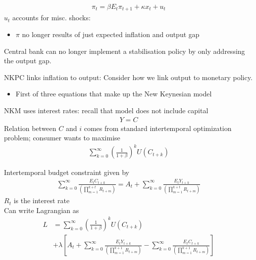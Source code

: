 \documentclass{beamer}
\begin{document}
\begin{frame}
  \begin{align}
  \pi_t=\beta E_t \pi_{t+1} + \kappa x_t + u_t
\end{align} 
 $u_t$ accounts for misc. shocks:
 \begin{itemize}
   \item $\pi$ no longer results of just expected inflation and output gap
 \end{itemize}
 \medskip
 Central bank can no longer implement a stabilisation policy by only addressing the output gap. 
\end{frame}

\begin{frame}
  NKPC links inflation to output: Consider how we link output to monetary policy. 
  \begin{itemize}
    \item First of three equations that make up the New Keynesian model
  \end{itemize}
  NKM uses interest rates: recall that model does not include capital
  \begin{align}
    Y=C
  \end{align}
   Relation between $C$ and $i$ comes from standard intertemporal optimization problem; consumer wants to maximise
\begin{align}  
 \sum_{k=0}^{\infty}\left(\frac{1}{1+\beta}\right)^k U(C_{t+k}) 
 \end{align}  
\end{frame}

\begin{frame}
  Intertemporal budget constraint given by  
\begin{align}
  \sum_{k=0}^{\infty} \frac{E_t C_{t+k}}{\left(\prod_{m=1}^{k+t}R_{t+m} \right)} =
   A_t +   \sum_{k=0}^{\infty} \frac{E_t Y_{t+k}}{\left(\prod_{m=1}^{k+t}R_{t+m} \right)}
\end{align}
$R_t$ is the interest rate\\
Can write Lagrangian as
\begin{align}
  L &= \sum_{k=0}^{\infty} \left(\frac{1}{1+\beta} \right)^k U(C_{t+k}) \\ \nonumber
  &+ \lambda \left[A_t + \sum_{k=0}^{\infty} \frac{E_t Y_{t+k}}{\left( \prod_{m=1}^{k+1} R_{t+m} \right)} -
  \sum_{k=0}^{\infty} \frac{E_t C_{t+k}}{\left( \prod_{m=1}^{k+1} R_{t+m} \right)} \right ]
\end{align}
\end{frame}
\end{document}
